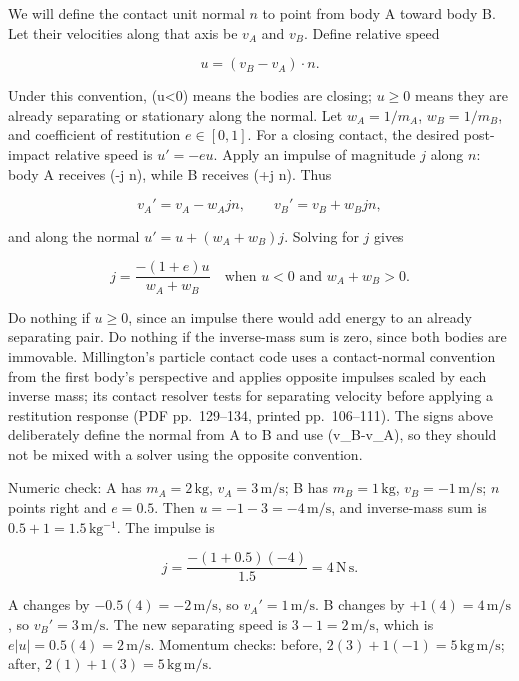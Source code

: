 \hypertarget{06-engine-ii-ch033-one-dimensional-collision-impulse-with-signs-made-explicit}{}

We will define the contact unit normal \(n\) to point from body A toward body B. Let their velocities along that axis be \(v_A\) and \(v_B\). Define relative speed

\[
u=(v_B-v_A)\cdot n.
\]

Under this convention, (u\textless0) means the bodies are closing; \(u\ge 0\) means they are already separating or stationary along the normal. Let \(w_A=1/m_A\), \(w_B=1/m_B\), and coefficient of restitution \(e\in[0,1]\). For a closing contact, the desired post-impact relative speed is \(u'=-e u\). Apply an impulse of magnitude \(j\) along \(n\): body A receives (-j n), while B receives (+j n). Thus

\[
v_A'=v_A-w_A j n,\qquad v_B'=v_B+w_B j n,
\]

and along the normal \(u'=u+(w_A+w_B)j\). Solving for \(j\) gives

\[
j=\frac{-(1+e)u}{w_A+w_B}\quad\text{when }u<0\text{ and }w_A+w_B>0.
\]

Do nothing if \(u\ge0\), since an impulse there would add energy to an already separating pair. Do nothing if the inverse-mass sum is zero, since both bodies are immovable. Millington's particle contact code uses a contact-normal convention from the first body's perspective and applies opposite impulses scaled by each inverse mass; its contact resolver tests for separating velocity before applying a restitution response (PDF pp.~129--134, printed pp.~106--111). The signs above deliberately define the normal from A to B and use (v\_B-v\_A), so they should not be mixed with a solver using the opposite convention.

Numeric check: A has \(m_A=2\,\mathrm{kg}\), \(v_A=3\,\mathrm{m/s}\); B has \(m_B=1\,\mathrm{kg}\), \(v_B=-1\,\mathrm{m/s}\); \(n\) points right and \(e=0.5\). Then \(u=-1-3=-4\,\mathrm{m/s}\), and inverse-mass sum is \(0.5+1=1.5\,\mathrm{kg^{-1}}\). The impulse is

\[
j=\frac{-(1+0.5)(-4)}{1.5}=4\,\mathrm{N\,s}.
\]

A changes by \(-0.5(4)=-2\,\mathrm{m/s}\), so \(v_A'=1\,\mathrm{m/s}\). B changes by \(+1(4)=4\,\mathrm{m/s}\), so \(v_B'=3\,\mathrm{m/s}\). The new separating speed is \(3-1=2\,\mathrm{m/s}\), which is \(e|u|=0.5(4)=2\,\mathrm{m/s}\). Momentum checks: before, \(2(3)+1(-1)=5\,\mathrm{kg\,m/s}\); after, \(2(1)+1(3)=5\,\mathrm{kg\,m/s}\).

